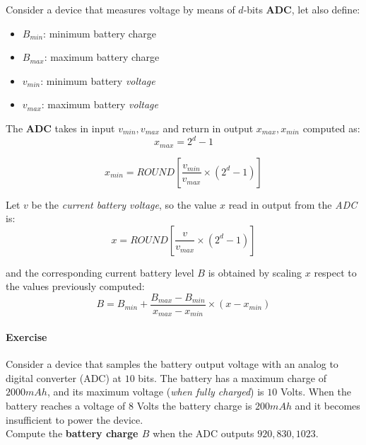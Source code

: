 \documentclass[10pt,a4paper]{report}
\theoremstyle{definition}
\begin{document}
Consider a device that measures voltage by means of $d$-bits \textbf{ADC}, let also define:
\begin{itemize}
	\item 
	$B_{min}$: minimum battery charge
	\item 
	$B_{max}$: maximum battery charge
	\item 
	$v_{min}$: minimum battery \textit{voltage}
	\item 
	$v_{max}$: maximum battery \textit{voltage}
\end{itemize}

The \textbf{ADC}  takes in input $v_{min},v_{max}$ and return in output  $x_{max},x_{min}$ computed as:
\begin{equation}
	x_{max} = 2^{d}-1
\end{equation}

\begin{equation}
		x_{min} = ROUND [\frac{v_{min}}{v_{max}}\times (2^{d}-1)]
\end{equation}


Let $v$ be the \textit{current battery voltage}, so the value $x$ read in output from the \textit{ADC} is:
\begin{equation}
	x = ROUND [\frac{v}{v_{max}}\times (2^{d}-1)]
\end{equation}

and the corresponding current battery level $B$ is obtained by scaling $x$ respect to the values previously computed:
\begin{equation}
	B = B_{min}+\frac{B_{max}-B_{min}}{x_{max}-x_{min}} \times (x-x_{min})
\end{equation}

\paragraph{Exercise}\label{sec:exercise}
Consider a device that samples the battery output voltage with an analog to digital converter (ADC) at $10$ bits.
The battery has a maximum charge of $2000 mAh$, and its maximum voltage (\textit{when fully charged}) is $10$ Volts.
When the battery reaches a voltage of $8$ Volts the battery charge is $200mAh$ and it becomes insufficient to power the device.\\
Compute the \textbf{battery charge $B$} when the ADC outputs $920, 830, 1023$.
\end{document}
